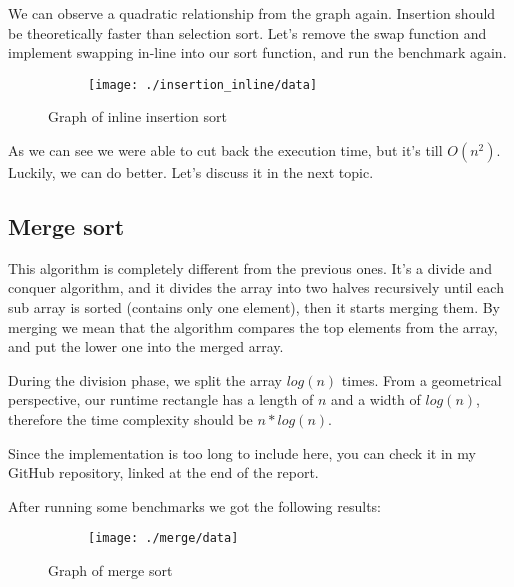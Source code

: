 \documentclass[a4paper,11pt]{article}
\begin{document}
    We can observe a quadratic relationship from the graph again.
    Insertion should be theoretically faster than selection sort.
    Let's remove the swap function and implement swapping in-line into our sort function, and run the benchmark again.

    \begin{figure}[h]
        \centering
        \begin{subfigure}[b]{.5\textwidth}
            \centering
            \texttt{[image: ./insertion\_inline/data]} %
        \end{subfigure}
        \caption{Graph of inline insertion sort}
        \label{fig:graph_3}
    \end{figure}

    As we can see we were able to cut back the execution time, but it's till $O(n^2)$.
    Luckily, we can do better.
    Let's discuss it in the next topic.

    \subsection*{Merge sort}

    This algorithm is completely different from the previous ones.
    It's a divide and conquer algorithm, and it divides the array into two halves recursively until each sub array is sorted (contains only one element), then it starts merging them.
    By merging we mean that the algorithm compares the top elements from the array, and put the lower one into the merged array.

    During the division phase, we split the array $log(n)$ times.
    From a geometrical perspective, our runtime rectangle has a length of $n$ and a width of $log(n)$, therefore the time complexity should be $n*log(n)$.

    Since the implementation is too long to include here, you can check it in my GitHub repository, linked at the end of the report.

    After running some benchmarks we got the following results:

    \begin{figure}[H]
        \centering
        \begin{subfigure}[b]{.5\textwidth}
            \centering
            \texttt{[image: ./merge/data]} %
        \end{subfigure}
        \caption{Graph of merge sort}
        \label{fig:graph_4}
    \end{figure}
\end{document}
